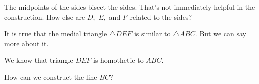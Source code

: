 
The midpoints of the sides bisect the sides. That's not immediately helpful in the construction. How else are $D,$ $E,$ and $F$ related to the sides?



It is true that the medial triangle $\triangle DEF$ is similar to $\triangle ABC$. But we can say more about it.





We know that triangle $DEF$ is homothetic to $ABC.$






How can we construct the line $BC$?



